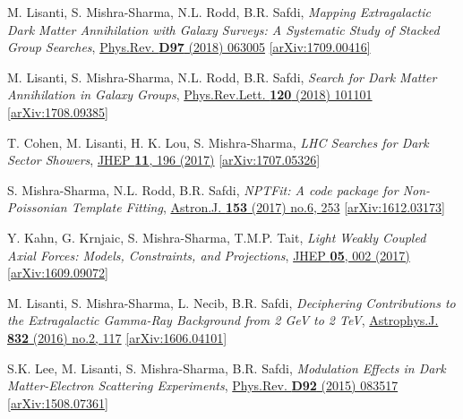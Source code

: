 \documentclass[11pt]{article}
\newenvironment{packed_enumerate}[1][]{
\begin{etaremune}[#1]
  \setlength{\itemsep}{3pt}
  \setlength{\parskip}{0pt}
  \setlength{\parsep}{0pt}}{\end{etaremune}
}
\begin{document}
\begin{packed_enumerate}[start=24]
\item M. Lisanti, S. Mishra-Sharma, N.L. Rodd, B.R. Safdi, \emph{Mapping Extragalactic Dark Matter Annihilation with Galaxy Surveys: A Systematic Study of Stacked Group Searches},  \href{https://journals.aps.org/prd/abstract/10.1103/PhysRevD.97.063005}{Phys.Rev. \textbf{D97} (2018) 063005} \href{https://arxiv.org/abs/1709.00416}{[arXiv:1709.00416]}

\item M. Lisanti, S. Mishra-Sharma, N.L. Rodd, B.R. Safdi, \emph{Search for Dark Matter Annihilation in Galaxy Groups},  \href{https://journals.aps.org/prl/abstract/10.1103/PhysRevLett.120.101101}{Phys.Rev.Lett. \textbf{120} (2018) 101101} \href{https://arxiv.org/abs/1708.09385}{[arXiv:1708.09385]}

\item T. Cohen, M. Lisanti, H. K. Lou, S. Mishra-Sharma, \emph{LHC Searches for Dark Sector Showers},  \href{https://link.springer.com/article/10.1007/JHEP11(2017)196}{JHEP \textbf{11}, 196 (2017)}  \href{https://arxiv.org/abs/1707.05326}{ [arXiv:1707.05326]}

\item S. Mishra-Sharma, N.L. Rodd, B.R. Safdi, \emph{NPTFit: A code package for Non-Poissonian Template Fitting},  \href{http://iopscience.iop.org/article/10.3847/1538-3881/aa6d5f/meta}{Astron.J. \textbf{153} (2017) no.6, 253}  \href{https://arxiv.org/abs/1612.03173}{ [arXiv:1612.03173]}

\item Y. Kahn, G. Krnjaic, S. Mishra-Sharma, T.M.P. Tait, \emph{Light Weakly Coupled Axial Forces: Models, Constraints, and Projections},  \href{https://link.springer.com/article/10.1007%2FJHEP05%282017%29002}{JHEP \textbf{05}, 002 (2017)}  \href{https://arxiv.org/abs/1609.09072}{[arXiv:1609.09072]}

\item M. Lisanti, S. Mishra-Sharma, L. Necib, B.R. Safdi, \emph{Deciphering Contributions to the Extragalactic Gamma-Ray Background from 2 GeV to 2 TeV},  \href{http://iopscience.iop.org/article/10.3847/0004-637X/832/2/117/meta}{Astrophys.J. \textbf{832} (2016) no.2, 117} \href{https://arxiv.org/abs/1606.04101}{[arXiv:1606.04101]}

\item S.K. Lee, M. Lisanti, S. Mishra-Sharma, B.R. Safdi, \emph{Modulation Effects in Dark Matter-Electron Scattering Experiments}, \href{https://journals.aps.org/prd/abstract/10.1103/PhysRevD.92.083517}{Phys.Rev. \textbf{D92} (2015) 083517} \href{https://arxiv.org/abs/1508.07361}{[arXiv:1508.07361]}

\end{packed_enumerate}
\end{document}
